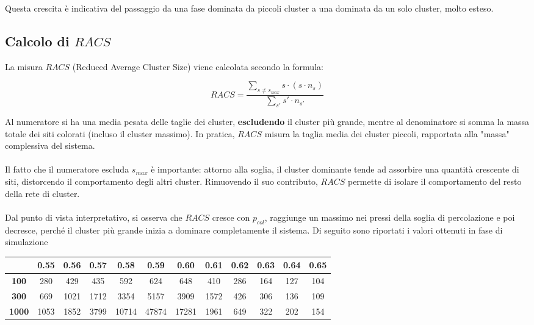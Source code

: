 \vspace{15px}
\noindent
Questa crescita è indicativa del passaggio da una fase dominata da piccoli cluster a una dominata da un solo cluster, molto esteso.

\subsection{Calcolo di $RACS$}

La misura $RACS$ (Reduced Average Cluster Size) viene calcolata secondo la formula:

\vspace{4px}
\begin{equation}
RACS= \frac{\sum\limits_{s \neq s_{max}} s \cdot (s \cdot n_s)}{\sum\limits_{s'} s' \cdot n_{s'}}
\end{equation}

\vspace{4px}
\noindent
Al numeratore si ha una media pesata delle taglie dei cluster, \textbf{escludendo} il cluster più grande, mentre al denominatore si somma la massa totale dei siti colorati (incluso il cluster massimo). In pratica, $RACS$ misura la taglia media dei cluster piccoli, rapportata alla "massa" complessiva del sistema.
\\\\
\noindent
Il fatto che il numeratore escluda $s_{max}$ è importante: attorno alla soglia, il cluster dominante tende ad assorbire una quantità crescente di siti, distorcendo il comportamento degli altri cluster. Rimuovendo il suo contributo, $RACS$ permette di isolare il comportamento del resto della rete di cluster.
\\\\
\noindent
Dal punto di vista interpretativo, si osserva che $RACS$ cresce con $p_{col}$, raggiunge un massimo nei pressi della soglia di percolazione e poi decresce, perché il cluster più grande inizia a dominare completamente il sistema. Di seguito sono riportati i valori ottenuti in fase di simulazione

\vspace{15px}
\noindent
\begin{tabular}{|c|*{11}{c|}}
	\hline
	\textbf{} & \textbf{0.55} & \textbf{0.56} & \textbf{0.57} & \textbf{0.58} & \textbf{0.59} & \textbf{0.60} & \textbf{0.61} & \textbf{0.62} & \textbf{0.63} & \textbf{0.64} & \textbf{0.65} \\
	\hline
	\textbf{100}  & 280 & 429 & 435 & 592 & 624 & 648 & 410 & 286 & 164 & 127 & 104 \\
	\hline
	\textbf{300}  & 669 & 1021 & 1712 & 3354 & 5157 & 3909 & 1572 & 426 & 306 & 136 & 109 \\
	\hline
	\textbf{1000} & 1053 & 1852 & 3799 & 10714 & 47874 & 17281 & 1961 & 649 & 322 & 202 & 154 \\
	\hline
\end{tabular}

